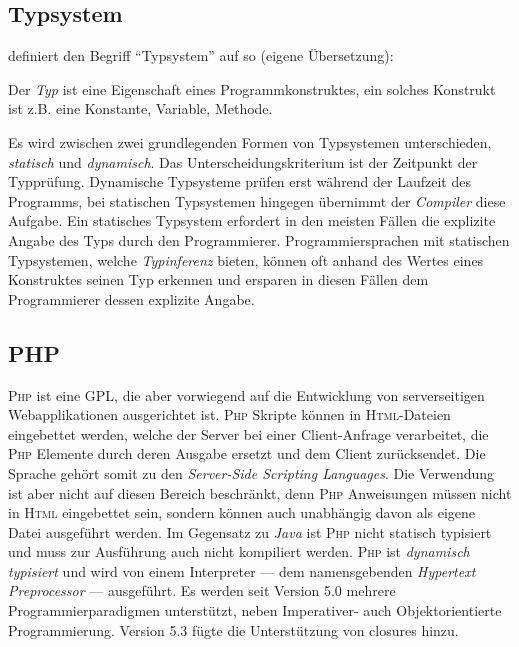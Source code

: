 \subsection{Typsystem}
\label{sec:typesystem}

\citeauthor{voelterDSLEngineering} definiert den Begriff \enquote{Typsystem} auf \cite[][S. 253]{voelterDSLEngineering} so (eigene Übersetzung):


Der \emph{Typ} ist eine Eigenschaft eines Programmkonstruktes, ein solches Konstrukt ist z.B. eine Konstante, Variable, Methode.

Es wird zwischen zwei grundlegenden Formen von Typsystemen unterschieden, \emph{statisch} und \emph{dynamisch}. Das Unterscheidungskriterium ist der Zeitpunkt der Typprüfung. Dynamische Typsysteme prüfen erst während der Laufzeit des Programms, bei statischen Typsystemen hingegen übernimmt der \emph{Compiler} diese Aufgabe. Ein statisches Typsystem erfordert in den meisten Fällen die explizite Angabe des Typs durch den Programmierer. Programmiersprachen mit statischen Typsystemen, welche \emph{Typinferenz} bieten, können oft anhand des Wertes eines Konstruktes seinen Typ erkennen und ersparen in diesen Fällen dem Programmierer dessen explizite Angabe.

\subsection{PHP}
\label{sec:php}

\textsc{Php} ist eine \gls{GPL}, die aber vorwiegend auf die Entwicklung von serverseitigen Webapplikationen ausgerichtet ist. \textsc{Php} Skripte können in \textsc{Html}-Dateien eingebettet werden, welche der Server bei einer Client-Anfrage verarbeitet, die \textsc{Php} Elemente durch deren Ausgabe ersetzt und dem Client zurücksendet. Die Sprache gehört somit zu den \emph{Server-Side Scripting Languages}. Die Verwendung ist aber nicht auf diesen Bereich beschränkt, denn \textsc{Php} Anweisungen müssen nicht in \textsc{Html} eingebettet sein, sondern können auch unabhängig davon als eigene Datei ausgeführt werden.
Im Gegensatz zu \emph{Java} ist \textsc{Php} nicht statisch typisiert und muss zur Ausführung auch nicht kompiliert werden. \textsc{Php} ist \emph{dynamisch typisiert} und wird von einem Interpreter --- dem namensgebenden \emph{Hypertext Preprocessor} --- ausgeführt.
Es werden seit Version 5.0 mehrere Programmierparadigmen unterstützt, neben Imperativer- auch Objektorientierte Programmierung. Version 5.3 fügte die Unterstützung von \glspl{closure} hinzu.

